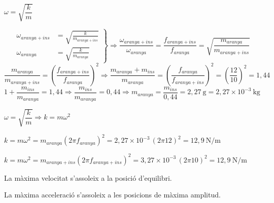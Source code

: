 \begin{solapartat}
 $\omega = \sqrt{\dfrac{k}{m}}$

\[
\left.
\begin{aligned}
\omega_\mathit{aranya+ins} &= \sqrt{\frac{k}{m_\mathit{aranya+ins}}}\\[4pt]
\omega_\mathit{aranya} &= \sqrt{\frac{k}{m_\mathit{aranya}}}
\end{aligned}
\right\}
\Rightarrow \frac{\omega_\mathit{aranya+ins}}{\omega_\mathit{aranya}} = \frac{f_\mathit{aranya+ins}}{f_\mathit{aranya}} = \sqrt{\frac{m_\mathit{aranya}}{m_\mathit{aranya+ins}}}
\]
\[
\frac{m_\mathit{aranya}}{m_\mathit{aranya+ins}} = \left(\frac{f_\mathit{aranya+ins}}{f_\mathit{aranya}}\right)^2
\Longrightarrow \frac{m_\mathit{aranya} + m_\mathit{ins}}{m_\mathit{aranya}} = \left(\frac{f_\mathit{aranya}}{f_\mathit{aranya+ins}}\right)^2 = \left(\frac{12}{10}\right)^2 = 1,44
\]
\[
1 + \frac{m_\mathit{ins}}{m_\mathit{aranya}} = 1,44 \Longrightarrow \frac{m_\mathit{ins}}{m_\mathit{aranya}} = 0,44 \Longrightarrow m_\mathit{aranya} = \frac{m_\mathit{ins}}{0,44} = 2,27\ \mathrm{g} = 2,27\times 10^{-3}\ \mathrm{kg}
\]
\end{solapartat}

\begin{solapartat}
 $\omega = \sqrt{\dfrac{k}{m}} \Rightarrow k = m\omega^2$

 $k = m\omega^2 = m_\mathit{aranya}\left(2\pi f_\mathit{aranya}\right)^2 = 2,27\times 10^{-3}\,(2\pi 12)^2 = 12,9\ \mathrm{N/m}$


 $k = m\omega^2 = m_\mathit{aranya+ins}\left(2\pi f_\mathit{aranya+ins}\right)^2 = 3,27\times 10^{-3}\,(2\pi 10)^2 = 12,9\ \mathrm{N/m}$

 La màxima velocitat s'assoleix a la posició d'equilibri.

 La màxima acceleració s'assoleix a les posicions de màxima amplitud.
\end{solapartat}
